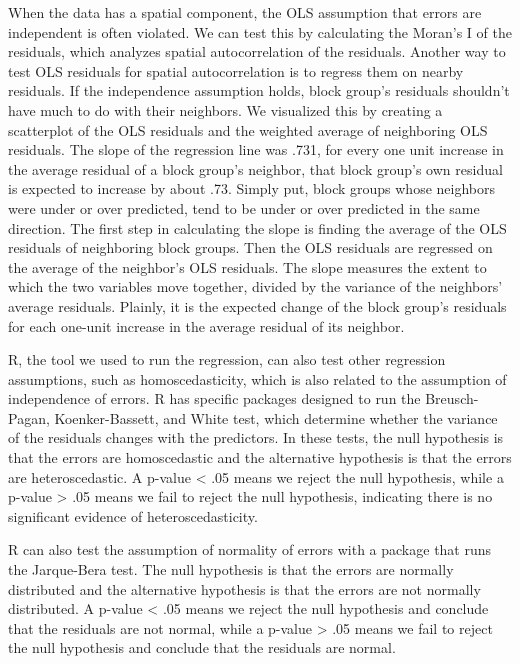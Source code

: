 \documentclass[
  12pt,
]{article}
\begin{document}
When the data has a spatial component, the OLS assumption that errors
are independent is often violated. We can test this by calculating the
Moran's I of the residuals, which analyzes spatial autocorrelation of
the residuals. Another way to test OLS residuals for spatial
autocorrelation is to regress them on nearby residuals. If the
independence assumption holds, block group's residuals shouldn't have
much to do with their neighbors. We visualized this by creating a
scatterplot of the OLS residuals and the weighted average of neighboring
OLS residuals. The slope of the regression line was .731, for every one
unit increase in the average residual of a block group's neighbor, that
block group's own residual is expected to increase by about .73. Simply
put, block groups whose neighbors were under or over predicted, tend to
be under or over predicted in the same direction. The first step in
calculating the slope is finding the average of the OLS residuals of
neighboring block groups. Then the OLS residuals are regressed on the
average of the neighbor's OLS residuals. The slope measures the extent
to which the two variables move together, divided by the variance of the
neighbors' average residuals. Plainly, it is the expected change of the
block group's residuals for each one-unit increase in the average
residual of its neighbor.

R, the tool we used to run the regression, can also test other
regression assumptions, such as homoscedasticity, which is also related
to the assumption of independence of errors. R has specific packages
designed to run the Breusch-Pagan, Koenker-Bassett, and White test,
which determine whether the variance of the residuals changes with the
predictors. In these tests, the null hypothesis is that the errors are
homoscedastic and the alternative hypothesis is that the errors are
heteroscedastic. A p-value \textless{} .05 means we reject the null
hypothesis, while a p-value \textgreater{} .05 means we fail to reject
the null hypothesis, indicating there is no significant evidence of
heteroscedasticity.

R can also test the assumption of normality of errors with a package
that runs the Jarque-Bera test. The null hypothesis is that the errors
are normally distributed and the alternative hypothesis is that the
errors are not normally distributed. A p-value \textless{} .05 means we
reject the null hypothesis and conclude that the residuals are not
normal, while a p-value \textgreater{} .05 means we fail to reject the
null hypothesis and conclude that the residuals are normal.
\end{document}
